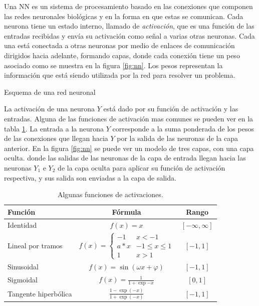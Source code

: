 Una NN es un sistema de procesamiento basado en las conexiones que componen las redes neuronales biológicas y en la forma en que estas se comunican. Cada neurona tiene un estado interno, llamado de {\em activación}, que es una función de las entradas recibidas y envía su activación como señal a varias otras neuronas. Cada una está conectada a otras neuronas por medio de enlaces de comunicación dirigidos hacia adelante, formando capas, donde cada conexión tiene un peso asociado como se muestra en la figura \ref{fig:nn}. Los pesos representan la información que está siendo utilizada por la red para resolver un problema.
\begin{imagen}
	\scalebox{0.8}{}
	\caption{Esquema de una red neuronal}
	\label{fig:nn}
\end{imagen}

La activación de una neurona $Y$ está dado por su función de activación y las entradas. Alguna de las funciones de activación mas comunes se pueden ver en la tabla \ref{tab:f_activacion}. La entrada a la neurona $Y$ corresponde a la suma ponderada de los pesos de las conexiones que llegan hacia $Y$ por la salida de las neuronas de la capa anterior. En la figura \ref{fig:nn} se puede ver un modelo de tres capas, con una capa oculta. donde las salidas de las neuronas de la capa de entrada llegan hacia las neuronas $Y_1$ e $Y_2$ de la capa oculta para aplicar su función de activación respectiva, y sus salida son enviadas a la capa de salida.

\begin{table}[H]
	\centering
	\begin{tabular}{|l|c|c|}\hline
		{\bf Función}	& {\bf Fórmula}	& {\bf Rango}\\\hline
		Identidad & $f(x) = x$	& $[-\infty, \infty]$\\\hline
		Lineal por tramos &
		$f(x) = \left\{
		\begin{array}{ll}
			-1		& x < -1\\
			a*x		& -1 \leq x \leq 1\\
			1		& x > 1
		\end{array}
		\right. $	& $[-1, 1]$\\\hline
		Sinusoidal	& $ f(x) = \sin(\omega x + \varphi) $	& $[-1, 1]$\\\hline
		Sigmoidal	& $f(x) = \frac{1}{1 + \exp{-x}}$	& $[0, 1]$\\\hline
		Tangente hiperbólica	& $\frac{1 - \exp(-x)}{1 + \exp(-x)}$	& $[-1, 1]$\\\hline
	\end{tabular}
	\caption{Algunas funciones de activaciones.}
	\label{tab:f_activacion}
\end{table}


